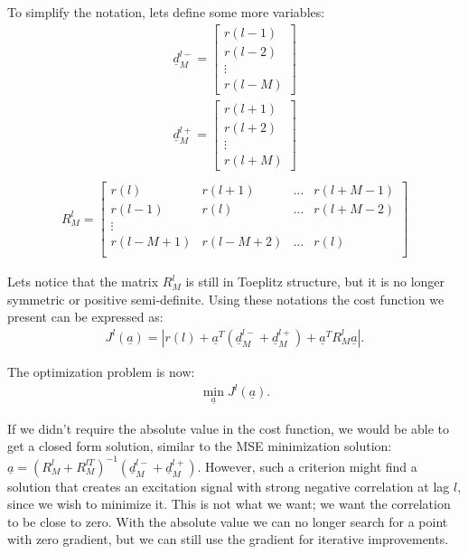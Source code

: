 \documentclass[journal,onecolumn]{IEEEtran}
\begin{document}
To simplify the notation, lets define some more variables:
\begin{align*}
\underline{d}_M^{l-} = \begin{bmatrix} r(l-1) \\ r(l-2) \\ \vdots \\ r(l-M) \end{bmatrix} \\
\underline{d}_M^{l+} = \begin{bmatrix} r(l+1) \\ r(l+2) \\ \vdots \\ r(l+M) \end{bmatrix} \\
\end{align*}
\begin{align*}
R_M^l = 
\begin{bmatrix}
r(l) & r(l+1) & \ldots & r(l+M-1) \\ 
r(l-1) & r(l) & \ldots & r(l+M-2) \\ 
\vdots & & & \\ 
r(l-M+1) & r(l-M+2) & \ldots & r(l) \\
\end{bmatrix}
\end{align*}

Lets notice that the matrix $R_M^l$ is still in Toeplitz structure, but it is no longer symmetric or positive semi-definite.
Using these notations the cost function we present can be expressed as:
\begin{align*}
J^l(\underline{a}) = \left| r(l) + \underline{a}^T\left( \underline{d}_M^{l-} + \underline{d}_M^{l+} \right) + \underline{a}^T R_M^l\underline{a} \right|.
\end{align*}

The optimization problem is now:
\begin{align*}
\min\limits_{\underline{a}}{J^l(\underline{a})}.
\end{align*}

If we didn't require the absolute value in the cost function, we would be able to get a closed form solution, similar to the MSE minimization solution: $\underline{a} = \left( R_M^l + R_M^{lT} \right)^{-1}\left( \underline{d}_M^{l-} + \underline{d}_M^{l+} \right)$. However, such a criterion might find a solution that creates an excitation signal with strong negative correlation at lag $l$, since we wish to minimize it. This is not what we want; we want the correlation to be close to zero. With the absolute value we can no longer search for a point with zero gradient, but we can still use the gradient for iterative improvements.
\end{document}
